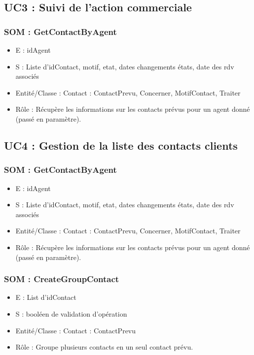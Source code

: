 \subsection{UC3 : Suivi de l’action commerciale}
\subsubsection{SOM : GetContactByAgent}
	\begin{itemize}
		\item E : idAgent
		\item S : Liste d’idContact, motif, etat, dates changements états, date des rdv associés
		\item Entité/Classe : Contact : ContactPrevu, Concerner, MotifContact, Traiter
		\item Rôle : Récupère les informations sur les contacts prévus pour un agent donné
	(passé en paramètre).
	\end{itemize}



\subsection{UC4 : Gestion de la liste des contacts clients}
\subsubsection{SOM : GetContactByAgent}
	\begin{itemize}
		\item E : idAgent
		\item S : Liste d’idContact, motif, etat, dates changements états, date des rdv associés
		\item Entité/Classe : Contact : ContactPrevu, Concerner, MotifContact, Traiter
		\item Rôle : Récupère les informations sur les contacts prévus pour un agent donné
	(passé en paramètre).
	\end{itemize}

\subsubsection{SOM : CreateGroupContact}
	\begin{itemize}
		\item E : List d’idContact
		\item S : booléen de validation d’opération
		\item Entité/Classe : Contact : ContactPrevu
		\item Rôle : Groupe plusieurs contacts en un seul contact prévu.
	\end{itemize}

